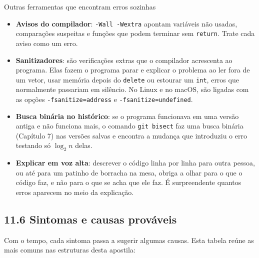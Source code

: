 \begin{destaque}{Outras ferramentas que encontram erros sozinhas}
\begin{itemize}
  \item \textbf{Avisos do compilador}: \texttt{-Wall -Wextra} apontam variáveis não usadas, comparações suspeitas e funções que podem terminar sem \texttt{return}. Trate cada aviso como um erro.
  \item \textbf{Sanitizadores}: são verificações extras que o compilador acrescenta ao programa. Elas fazem o programa parar e explicar o problema ao ler fora de um vetor, usar memória depois do \texttt{delete} ou estourar um \texttt{int}, erros que normalmente passariam em silêncio. No Linux e no macOS, são ligadas com as opções \texttt{-fsanitize=address} e \texttt{-fsanitize=undefined}.
  \item \textbf{Busca binária no histórico}: se o programa funcionava em uma versão antiga e não funciona mais, o comando \texttt{git bisect} faz uma busca binária (Capítulo 7) nas versões salvas e encontra a mudança que introduziu o erro testando só $\log_2 n$ delas.
  \item \textbf{Explicar em voz alta}: descrever o código linha por linha para outra pessoa, ou até para um patinho de borracha na mesa, obriga a olhar para o que o código faz, e não para o que se acha que ele faz. É surpreendente quantos erros aparecem no meio da explicação.
\end{itemize}
\end{destaque}

\subsection{11.6 Sintomas e causas prováveis}

Com o tempo, cada sintoma passa a sugerir algumas causas. Esta tabela reúne as mais comuns nas estruturas desta apostila:

